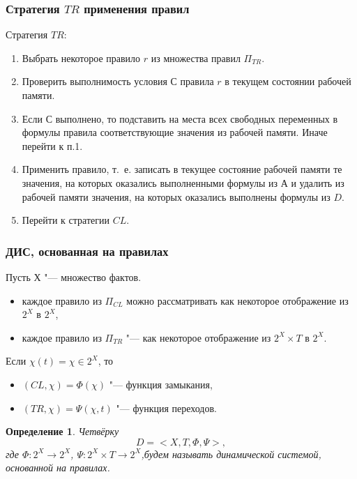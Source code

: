 \documentclass[default]{beamer}
\newtheorem{Def}{Определение}
\begin{document}
	\begin{frame}
		\frametitle{Стратегия $TR$ применения правил}
		
		Стратегия $TR$:
		\begin{enumerate}
			\item Выбрать некоторое правило $r$ из множества правил $\Pi_{TR}$.
			\item Проверить выполнимость условия $С$ правила $r$ в текущем состоянии рабочей памяти.
			\item Если $С$ выполнено, то подставить на места всех свободных переменных в формулы правила соответствующие значения из рабочей памяти. Иначе перейти к п.1.
			\item  Применить правило, т.~е. записать в текущее состояние рабочей памяти те значения, на которых оказались выполненными формулы из $А$ и удалить из рабочей памяти значения, на которых оказались выполнены формулы из $D$.  
			\item Перейти к стратегии $CL$.
		\end{enumerate}
		
	\end{frame}

	\begin{frame}
		\frametitle{ДИС, основанная на правилах}
		
		Пусть $Х$ "--- множество фактов. 
		\begin{itemize}
			\item каждое правило из $\Pi_{CL}$ можно рассматривать как некоторое отображение из $2^X$ в $2^X$,
			\item каждое правило из $\Pi_{TR}$ "--- как некоторое отображение из $2^X\times T$ в $2^X$.
		\end{itemize}
		\par\bigskip
		Если $\chi(t) = \chi\in 2^X$, то
		\begin{itemize}
			 \item $(CL,\chi)=\Phi(\chi)$ "--- функция замыкания,
			 \item $(TR,\chi)=\Psi(\chi,t)$ "--- функция переходов.
		\end{itemize}
		\par\bigskip
		\begin{Def}
			Четвёрку  
			\begin{equation}
				D=<X,T,\Phi,\Psi>,
			\end{equation}
			где $\Phi:2^X\rightarrow 2^X$, $\Psi:2^X\times T\rightarrow 2^X$,будем называть динамической системой, основанной на правилах.
		\end{Def}
	\end{frame}
	
\end{document}
